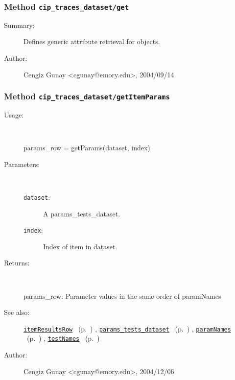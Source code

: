 \subsubsection[Method \texttt{get}]{Method \texttt{cip\_traces\_dataset/get}}%
%
\label{ref_cip_traces_dataset__get}%
\hypertarget{ref_cip_traces_dataset__get}{}%
\begin{description}
\item[Summary:]Defines generic attribute retrieval for objects.
%
%
%
%
%
%
%
\item[Author:]%
Cengiz Gunay <cgunay@emory.edu>, 2004/09/14
%
\end{description}
\methodline%
\subsubsection[Method \texttt{getItemParams}]{Method \texttt{cip\_traces\_dataset/getItemParams}}%
%
\label{ref_cip_traces_dataset__getItemParams}%
\hypertarget{ref_cip_traces_dataset__getItemParams}{}%
\begin{description}
%
\item[Usage:]~%
\begin{lyxcode}%
params\_row = getParams(dataset, index)
%
\end{lyxcode}%
%
%
\item[Parameters:]~
\begin{description}%
\item[\texttt{dataset}:]
 A params\_tests\_dataset.
\item[\texttt{index}:]
 Index of item in dataset.
\end{description}%
%
\item[Returns:
]~

	params\_row: Parameter values in the same order of paramNames
%
%
\item[See also:]%
\hyperlink{ref_itemResultsRow}{\texttt{itemResultsRow}}%
\ (p.~\pageref{ref_itemResultsRow})%
%
, \hyperlink{ref_params_tests_dataset}{\texttt{params\_tests\_dataset}}%
\ (p.~\pageref{ref_params_tests_dataset})%
%
, \hyperlink{ref_paramNames}{\texttt{paramNames}}%
\ (p.~\pageref{ref_paramNames})%
%
, \hyperlink{ref_testNames}{\texttt{testNames}}%
\ (p.~\pageref{ref_testNames})%
%
%
\item[Author:]%
Cengiz Gunay <cgunay@emory.edu>, 2004/12/06
%
\end{description}
\methodline%
